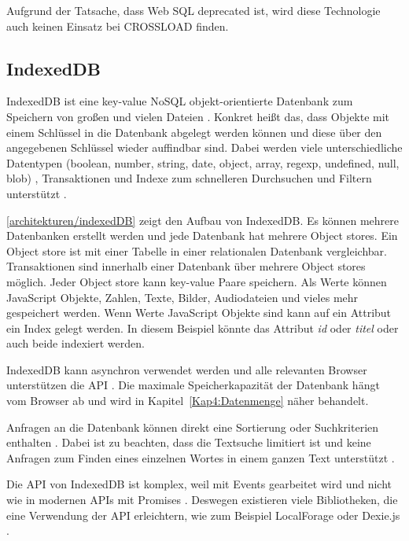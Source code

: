 Aufgrund der Tatsache, dass Web SQL deprecated ist, wird diese Technologie auch keinen Einsatz bei CROSSLOAD finden. 

\subsection{IndexedDB}
IndexedDB ist eine key-value NoSQL objekt-orientierte Datenbank zum Speichern von großen und vielen Dateien \autocite{Hajian2019}. Konkret heißt das, dass Objekte mit einem Schlüssel in die Datenbank abgelegt werden können und diese über den angegebenen Schlüssel wieder auffindbar sind. Dabei werden viele unterschiedliche Datentypen (boolean, number, string, date, object, array, regexp, undefined, null, \ac{blob}) \autocite{mdn-indexeddb}, Transaktionen und Indexe zum schnelleren Durchsuchen und Filtern unterstützt \autocite{Sheppard2017}. 

\autoref{architekturen/indexedDB} zeigt den Aufbau von IndexedDB. Es können mehrere Datenbanken erstellt werden und jede Datenbank hat mehrere Object stores. Ein Object store ist mit einer Tabelle in einer relationalen Datenbank vergleichbar. Transaktionen sind innerhalb einer Datenbank über mehrere Object stores möglich. Jeder Object store kann key-value Paare speichern. Als Werte können JavaScript Objekte, Zahlen, Texte, Bilder, Audiodateien und vieles mehr gespeichert werden. Wenn Werte JavaScript Objekte sind kann auf ein Attribut ein Index gelegt werden. In diesem Beispiel könnte das Attribut \textit{id} oder \textit{titel} oder auch beide indexiert werden.


IndexedDB kann asynchron verwendet werden \autocite{Hajian2019} \autocite{mdn-indexeddb} und alle relevanten Browser unterstützen die \ac{API} \autocite{mdn-indexeddb-api}. Die maximale Speicherkapazität der Datenbank hängt vom Browser ab und wird in Kapitel~\ref{Kap4:Datenmenge} näher behandelt.

Anfragen an die Datenbank können direkt eine Sortierung oder Suchkriterien enthalten \autocite{mdn-indexeddb}. Dabei ist zu beachten, dass die Textsuche limitiert ist und keine Anfragen zum Finden eines einzelnen Wortes in einem ganzen Text unterstützt \autocite{mdn-indexeddb}. 

Die \ac{API} von IndexedDB ist komplex, weil mit Events gearbeitet wird und nicht wie in modernen \acp{API} mit Promises \autocite{Hajian2019}. Deswegen existieren viele Bibliotheken, die eine Verwendung der \ac{API} erleichtern, wie zum Beispiel LocalForage oder Dexie.js \autocite{Hajian2019} \autocite{mdn-indexeddb}.

